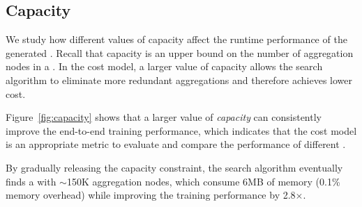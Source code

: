 \subsection{Capacity}
\label{subsec:eval_para}
We study how different values of capacity affect the runtime performance of the generated \xgs. 
Recall that capacity is an upper bound on the number of aggregation nodes in a \xg.
In the cost model, a larger value of capacity allows the \xg search algorithm to eliminate more redundant aggregations and therefore achieves lower cost.

Figure~\ref{fig:capacity} shows that a larger value of {\em capacity} can consistently improve the end-to-end training performance, which indicates that the cost model is an appropriate metric to evaluate and compare the performance of different \xgs.

By gradually releasing the capacity constraint, the search algorithm eventually finds a \xg with $\sim$150K aggregation nodes, which consume 6MB of memory (0.1\% memory overhead) while improving the training performance by 2.8$\times$.
